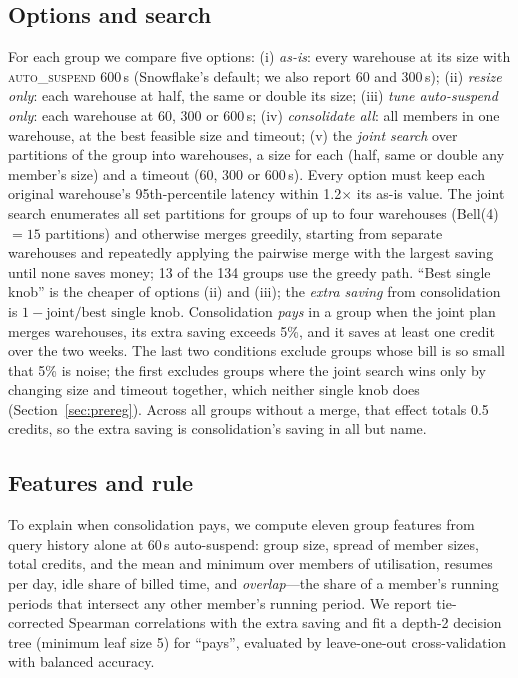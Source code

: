 \documentclass[conference]{IEEEtran}
\newcommand{\autos}{\textsc{auto\_suspend}}
\begin{document}
\subsection{Options and search}
For each group we compare five options:
(i) \emph{as-is}: every warehouse at its size with \autos{} 600\,s (Snowflake's default; we also report 60 and 300\,s);
(ii) \emph{resize only}: each warehouse at half, the same or double its size;
(iii) \emph{tune auto-suspend only}: each warehouse at 60, 300 or 600\,s;
(iv) \emph{consolidate all}: all members in one warehouse, at the best feasible size and timeout;
(v) the \emph{joint search} over partitions of the group into warehouses, a size for each (half, same or double any
member's size) and a timeout (60, 300 or 600\,s).
Every option must keep each original warehouse's 95th-percentile latency within 1.2$\times$ its as-is value. The joint
search enumerates all set partitions for groups of up to four warehouses (Bell(4)~$=15$ partitions) and otherwise merges
greedily, starting from separate warehouses and repeatedly applying the pairwise merge with the largest saving until none
saves money; 13 of the 134 groups use the greedy path. ``Best single knob'' is the cheaper of options (ii) and (iii);
the \emph{extra saving} from consolidation is $1 - \text{joint}/\text{best single knob}$. Consolidation \emph{pays} in a
group when the joint plan merges warehouses, its extra saving exceeds 5\%, and it saves at least one credit over the two
weeks. The last two conditions exclude groups whose bill is so small that 5\% is noise; the first excludes groups where the
joint search wins only by changing size and timeout together, which neither single knob does (Section~\ref{sec:prereg}).
Across all groups without a merge, that effect totals 0.5 credits, so the extra saving is consolidation's saving in all but
name.

\subsection{Features and rule}
To explain when consolidation pays, we compute eleven group features from query history alone at 60\,s auto-suspend:
group size, spread of member sizes, total credits, and the mean and minimum over members of utilisation, resumes per day,
idle share of billed time, and \emph{overlap}---the share of a member's running periods that intersect any other member's
running period. We report tie-corrected Spearman correlations with the extra saving and fit a depth-2 decision tree
(minimum leaf size 5) for ``pays'', evaluated by leave-one-out cross-validation with balanced accuracy.
\end{document}
